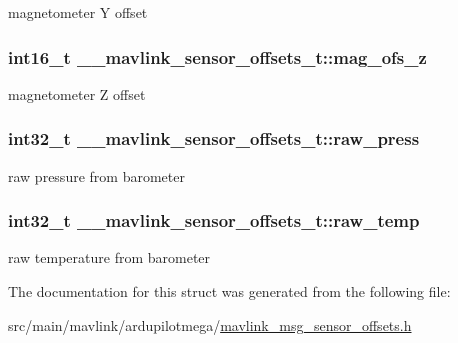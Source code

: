 magnetometer Y offset 

\hypertarget{struct____mavlink__sensor__offsets__t_aa9fff1075990d27c19d475ece1ebc147}{
\subsubsection[{mag\+\_\+ofs\+\_\+z}]{\setlength{\rightskip}{0pt plus 5cm}int16\+\_\+t \+\_\+\+\_\+mavlink\+\_\+sensor\+\_\+offsets\+\_\+t\+::mag\+\_\+ofs\+\_\+z}}\label{struct____mavlink__sensor__offsets__t_aa9fff1075990d27c19d475ece1ebc147}


magnetometer Z offset 

\hypertarget{struct____mavlink__sensor__offsets__t_aca20a64310b104873670ae597116ae59}{
\subsubsection[{raw\+\_\+press}]{\setlength{\rightskip}{0pt plus 5cm}int32\+\_\+t \+\_\+\+\_\+mavlink\+\_\+sensor\+\_\+offsets\+\_\+t\+::raw\+\_\+press}}\label{struct____mavlink__sensor__offsets__t_aca20a64310b104873670ae597116ae59}


raw pressure from barometer 

\hypertarget{struct____mavlink__sensor__offsets__t_a57a351a757513912f91f04c0f44e1f66}{
\subsubsection[{raw\+\_\+temp}]{\setlength{\rightskip}{0pt plus 5cm}int32\+\_\+t \+\_\+\+\_\+mavlink\+\_\+sensor\+\_\+offsets\+\_\+t\+::raw\+\_\+temp}}\label{struct____mavlink__sensor__offsets__t_a57a351a757513912f91f04c0f44e1f66}


raw temperature from barometer 



The documentation for this struct was generated from the following file\+:\begin{DoxyCompactItemize}
\item 
src/main/mavlink/ardupilotmega/\hyperlink{mavlink__msg__sensor__offsets_8h}{mavlink\+\_\+msg\+\_\+sensor\+\_\+offsets.\+h}\end{DoxyCompactItemize}
